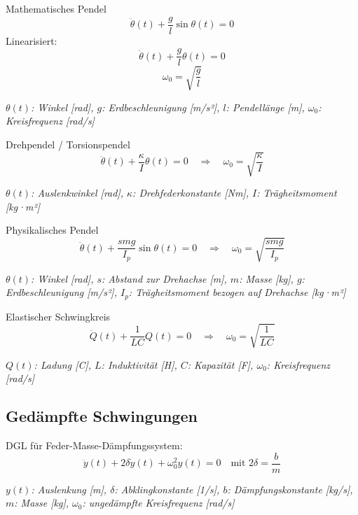 \documentclass[a4paper,10pt]{article}
\newenvironment{displayformula}
{
	\begin{framed}
		\color{formulaColor}
	}
	{\end{framed}}
\newcommand{\formulalegend}[1]{%
	\par\vspace{0.5ex}%
	{{\color{legendColor}\RaggedRight\small\textit{#1}}}%
	\par\vspace{1.5ex}%
}
\begin{document}
\begin{displayformula}
	Mathematisches Pendel
	\[
	\ddot{\theta}(t) + \frac{g}{l} \sin\theta(t) = 0
	\]
	Linearisiert:
	\[
	\ddot{\theta}(t) + \frac{g}{l} \theta(t) = 0
	\]
	\[
	\omega_0 = \sqrt{\frac{g}{l}}
	\]
\end{displayformula}
\formulalegend{
	\( \theta(t) \): Winkel [rad], \( g \): Erdbeschleunigung [m/s²], \( l \): Pendellänge [m], \( \omega_0 \): Kreisfrequenz [rad/s]
}

\begin{displayformula}
	Drehpendel / Torsionspendel
	\[
	\ddot{\theta}(t) + \frac{\kappa}{I} \theta(t) = 0
	\quad \Rightarrow \quad \omega_0 = \sqrt{\frac{\kappa}{I}}
	\]
\end{displayformula}
\formulalegend{
	\( \theta(t) \): Auslenkwinkel [rad], \( \kappa \): Drehfederkonstante [Nm], \( I \): Trägheitsmoment [kg·m²]
}

\begin{displayformula}
	Physikalisches Pendel
	\[
	\ddot{\theta}(t) + \frac{s m g}{I_p} \sin\theta(t) = 0
	\quad \Rightarrow \quad \omega_0 = \sqrt{\frac{s m g}{I_p}}
	\]
\end{displayformula}
\formulalegend{
	\( \theta(t) \): Winkel [rad], \( s \): Abstand zur Drehachse [m], \( m \): Masse [kg], \( g \): Erdbeschleunigung [m/s²], \( I_p \): Trägheitsmoment bezogen auf Drehachse [kg·m²]
}

\begin{displayformula}
	Elastischer Schwingkreis
	\[
	\ddot{Q}(t) + \frac{1}{LC} Q(t) = 0
	\quad \Rightarrow \quad \omega_0 = \sqrt{\frac{1}{LC}}
	\]
\end{displayformula}
\formulalegend{
	\( Q(t) \): Ladung [C], \( L \): Induktivität [H], \( C \): Kapazität [F], \( \omega_0 \): Kreisfrequenz [rad/s]
}


\subsection{Gedämpfte Schwingungen}

\begin{displayformula}
	DGL für Feder-Masse-Dämpfungssystem:
	\[
	\ddot{y}(t) + 2\delta \dot{y}(t) + \omega_0^2 y(t) = 0
	\quad \text{mit } 2\delta = \frac{b}{m}
	\]
\end{displayformula}
\formulalegend{
	\( y(t) \): Auslenkung [m], \( \delta \): Abklingkonstante [1/s], \( b \): Dämpfungskonstante [kg/s], \( m \): Masse [kg], \( \omega_0 \): ungedämpfte Kreisfrequenz [rad/s]
}
\end{document}
